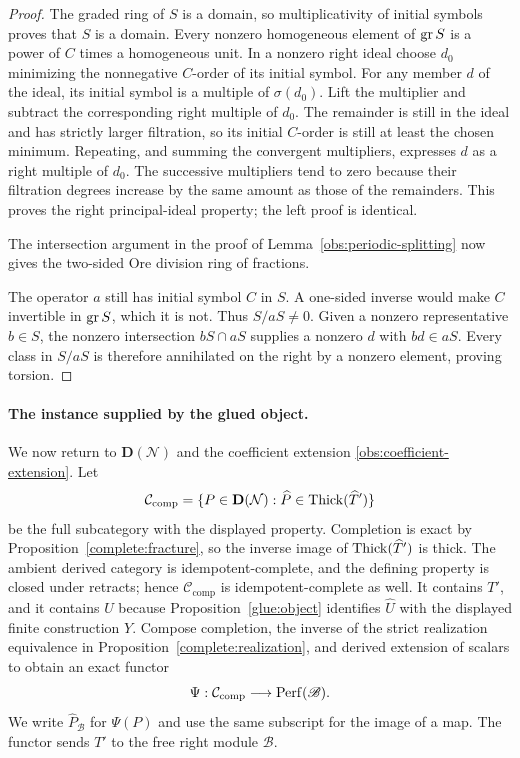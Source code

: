 \begin{proof}
The graded ring of $S$ is a domain, so multiplicativity of initial
symbols proves that $S$ is a domain.  Every nonzero homogeneous element
of $\operatorname{gr} S$ is a power of $C$ times a homogeneous unit.  In a nonzero
right ideal choose $d_0$ minimizing the nonnegative $C$-order of its
initial symbol.  For any member $d$ of the ideal, its initial symbol
is a multiple of $\sigma(d_0)$.  Lift the multiplier and subtract the
corresponding right multiple of $d_0$.  The remainder is still in the
ideal and has strictly larger filtration, so its initial $C$-order
is still at least the chosen minimum.  Repeating, and summing the
convergent multipliers, expresses $d$ as a right multiple of $d_0$.
The successive multipliers tend to zero because their filtration
degrees increase by the same amount as those of the remainders.
This proves the right principal-ideal property; the left proof is
identical.

The intersection argument in the proof of
Lemma~\ref{obs:periodic-splitting} now gives the two-sided Ore
division ring of fractions.

The operator $a$ still has initial symbol $C$ in $S$.  A one-sided
inverse would make $C$ invertible in $\operatorname{gr} S$, which it is not.
Thus $S/aS\ne0$.  Given a nonzero representative $b\in S$, the
nonzero intersection $bS\cap aS$ supplies a nonzero $d$ with
$bd\in aS$.  Every class in $S/aS$ is therefore annihilated on the
right by a nonzero element, proving torsion.
\end{proof}

\paragraph{The instance supplied by the glued object.}
We now return to $\mathbf D(\mathcal N)$ and the coefficient
extension \eqref{obs:coefficient-extension}.  Let
\[
 \mathcal C_{\mathrm{comp}}
 =\{P\in\mathbf D(\mathcal N):
       \widehat P\in\operatorname{Thick}(\widehat T')\}
\]
be the full subcategory with the displayed property.
Completion is exact by Proposition~\ref{complete:fracture}, so
the inverse image of $\operatorname{Thick}(\widehat T')$ is thick.  The ambient
derived category is idempotent-complete, and the defining property
is closed under retracts; hence $\mathcal C_{\mathrm{comp}}$ is
idempotent-complete as well.  It contains $T'$, and
it contains $U$ because Proposition~\ref{glue:object} identifies
$\widehat U$ with the displayed finite construction $Y$.
Compose completion, the inverse of the strict realization
equivalence in Proposition~\ref{complete:realization}, and derived
extension of scalars to obtain an exact functor
\[
 \Psi:\mathcal C_{\mathrm{comp}}\longrightarrow\operatorname{Perf}(\mathscr B).
\]
We write $\widehat P_{\mathscr B}$ for $\Psi(P)$ and use the
same subscript for the image of a map.  The functor sends $T'$
to the free right module $\mathscr B$.

